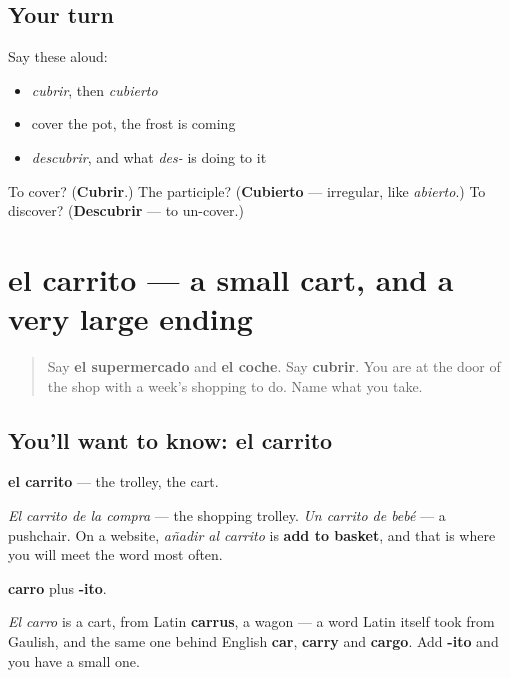\subsection*{Your turn}
Say these aloud:

\begin{itemize}
\raggedright
  \item \emph{cubrir}, then \emph{cubierto}
  \item cover the pot, the frost is coming
  \item \emph{descubrir}, and what \emph{des-} is doing to it
\end{itemize}

\begin{tcolorbox}[breakable,colback=teal!4,colframe=teal!35!black,title={Before you move on}]
To cover? (\textbf{Cubrir}.) The participle? (\textbf{Cubierto} — irregular, like \emph{abierto}.) To discover? (\textbf{Descubrir} — to un-cover.)
\end{tcolorbox}
\section[el carrito]{el carrito — a small cart, and a very large ending}

\label{lesson:ES-C444-carrito}



\begin{quote}
Say \textbf{el supermercado} and \textbf{el coche}. Say \textbf{cubrir}. You are at the door of the shop with a week's shopping to do. Name what you take.
\end{quote}

\subsection*{You'll want to know: el carrito}
\textbf{el carrito} — the trolley, the cart.

\emph{El carrito de la compra} — the shopping trolley. \emph{Un carrito de bebé} — a pushchair. On a website, \emph{añadir al carrito} is \textbf{add to basket}, and that is where you will meet the word most often.

\begin{cousinweb}
\textbf{carro} plus \textbf{-ito}.

\emph{El carro} is a cart, from Latin \textbf{carrus}, a wagon — a word Latin itself took from Gaulish, and the same one behind English \textbf{car}, \textbf{carry} and \textbf{cargo}. Add \textbf{-ito} and you have a small one.
\end{cousinweb}


